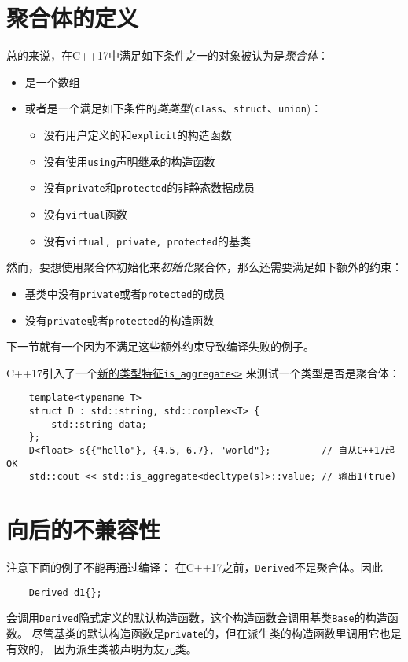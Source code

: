\section{聚合体的定义}\label{ch4.3}
总的来说，在C++17中满足如下条件之一的对象被认为是\emph{聚合体}：
\begin{itemize}
    \item 是一个数组
    \item 或者是一个满足如下条件的\emph{类类型}(\texttt{class}、\texttt{struct}、\texttt{union})：
    \begin{itemize}
        \item 没有用户定义的和\texttt{explicit}的构造函数
        \item 没有使用\texttt{using}声明继承的构造函数
        \item 没有\texttt{private}和\texttt{protected}的非静态数据成员
        \item 没有\texttt{virtual}函数
        \item 没有\texttt{virtual, private, protected}的基类
    \end{itemize}
\end{itemize}
然而，要想使用聚合体初始化来\emph{初始化}聚合体，那么还需要满足如下额外的约束：
\begin{itemize}
    \item 基类中没有\texttt{private}或者\texttt{protected}的成员
    \item 没有\texttt{private}或者\texttt{protected}的构造函数
\end{itemize}
下一节就有一个因为不满足这些额外约束导致编译失败的例子。

C++17引入了一个\hyperref[ch21.2.0.1]{新的类型特征\texttt{is\_aggregate<>}}
来测试一个类型是否是聚合体：
\begin{lstlisting}
    template<typename T>
    struct D : std::string, std::complex<T> {
        std::string data;
    };
    D<float> s{{"hello"}, {4.5, 6.7}, "world"};         // 自从C++17起OK
    std::cout << std::is_aggregate<decltype(s)>::value; // 输出1(true)
\end{lstlisting}

\section{向后的不兼容性}
注意下面的例子不能再通过编译：
在C++17之前，\texttt{Derived}不是聚合体。因此
\begin{lstlisting}
    Derived d1{};
\end{lstlisting}
会调用\texttt{Derived}隐式定义的默认构造函数，这个构造函数会调用基类\texttt{Base}的构造函数。
尽管基类的默认构造函数是\texttt{private}的，但在派生类的构造函数里调用它也是有效的，
因为派生类被声明为友元类。

